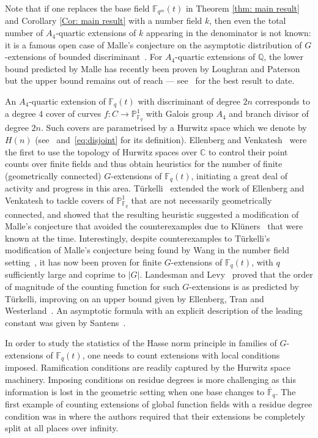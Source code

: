 \documentclass{amsart}
\numberwithin{equation}{section} \numberwithin{figure}{section}
\newcommand\FF{\mathbb{F}}
\newcommand\PP{\mathbb{P}}
\newcommand\QQ{\mathbb{Q}}
\newcommand\CC{\mathbb{C}}
\theoremstyle{one}
\theoremstyle{definition}
\begin{document}
Note that if one replaces the base field $\mathbb{F}_{q^m}(t)$ in Theorem \ref{thm: main result} and Corollary \ref{Cor: main result} with a number field $k$, then even the total number of $A_4$-quartic extensions of $k$ appearing in the denominator is not known: it is a famous open case of Malle's conjecture on the asymptotic distribution of $G$-extensions of bounded discriminant~\cite{mal:02, mal:04}. For $A_4$-quartic extensions of $\QQ$, the lower bound predicted by Malle has recently been proven by Loughran and Paterson~\cite{lou.pat:25} but the upper bound remains out of reach --- see~\cite{bstttz:20} for the best result to date.

An $A_4$-quartic extension of $\mathbb{F}_{q}(t)$ with discriminant of degree $2n$ corresponds to a degree $4$ cover of curves $f \colon C\to\PP^1_{\FF_q}$ with Galois group $A_4$ and branch divisor of degree $2n$.  Such covers are parametrised by a Hurwitz space which we denote by $H(n)$ (see~ and~\ref{eq:disjoint} for its definition). Ellenberg and Venkatesh~\cite{ell.ven:05} were the first to use the topology of Hurwitz spaces over $\CC$ to control their point counts over finite fields and thus obtain heuristics for the number of finite (geometrically connected) $G$-extensions of $\FF_q(t)$, initiating a great deal of activity and progress in this area. T\"{u}rkelli~\cite{trk:15} extended the work of Ellenberg and Venkatesh to tackle covers of $\PP^1_{\FF_q}$ that are not necessarily geometrically connected, and showed that the resulting heuristic suggested a modification of Malle's conjecture that avoided the counterexamples due to Kl\"{u}ners~\cite{kl:05} that were known at the time. Interestingly, despite counterexamples to T\"{u}rkelli's modification of Malle's conjecture being found by Wang in the number field setting~\cite{wan:}, it has now been proven for finite $G$-extensions of $\FF_q(t)$, with $q$ sufficiently large and coprime to $|G|$. Landesman and Levy~\cite{lan.lev:25-1} proved that the order of magnitude of the counting function for such $G$-extensions is as predicted by Türkelli, improving on an upper bound given by Ellenberg, Tran and Westerland~\cite{ell.tra.wes:}. An asymptotic formula with an explicit description of the leading constant was given by Santens~\cite{san:}.







In order to study the statistics of the Hasse norm principle in families of $G$-extensions of $\FF_q(t)$, one needs to count extensions with local conditions imposed. Ramification conditions are readily captured by the Hurwitz space machinery. Imposing conditions on residue degrees is more challenging as this information is lost in the geometric setting when one base changes to $\overline{\FF}_q$. The first example of counting extensions of global function fields with a residue degree condition was in \cite{liu.woo.zur:24} where the authors required that their extensions be completely split at all places over infinity. 
\end{document}
